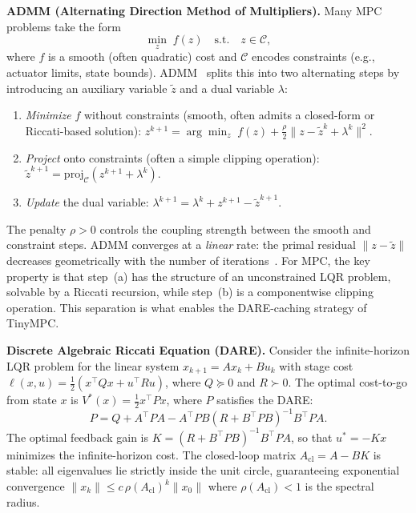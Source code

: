 \documentclass[letterpaper, 10pt, conference]{IEEEtran}
\begin{document}
\textbf{ADMM (Alternating Direction Method of Multipliers).}
Many MPC problems take the form
\begin{equation}\label{eq:admm_generic}
  \min_{z} \; f(z) \quad \text{s.t.} \quad z \in \mathcal{C},
\end{equation}
where $f$ is a smooth (often quadratic) cost and $\mathcal{C}$
encodes constraints (e.g., actuator limits, state bounds).
ADMM~\cite{boyd2011} splits this into two alternating steps
by introducing an auxiliary variable $\tilde{z}$ and a dual
variable $\lambda$:
\begin{enumerate}[label=(\alph*)]
  \item \emph{Minimize} $f$ without constraints (smooth, often
    admits a closed-form or Riccati-based solution):
    $z^{k+1} = \arg\min_z \; f(z) + \tfrac{\rho}{2}\|z - \tilde{z}^k + \lambda^k\|^2$.
  \item \emph{Project} onto constraints (often a simple clipping
    operation):
    $\tilde{z}^{k+1} = \mathrm{proj}_{\mathcal{C}}(z^{k+1} + \lambda^k)$.
  \item \emph{Update} the dual variable:
    $\lambda^{k+1} = \lambda^k + z^{k+1} - \tilde{z}^{k+1}$.
\end{enumerate}
The penalty $\rho > 0$ controls the coupling strength between
the smooth and constraint steps.
ADMM converges at a \emph{linear} rate: the primal residual
$\|z - \tilde{z}\|$ decreases geometrically with the number
of iterations~\cite{boyd2011}.
For MPC, the key property is that step~(a) has the structure
of an unconstrained LQR problem, solvable by a Riccati
recursion, while step~(b) is a componentwise clipping
operation.
This separation is what enables the DARE-caching strategy
of TinyMPC.

\textbf{Discrete Algebraic Riccati Equation (DARE).}
Consider the infinite-horizon LQR problem for the linear
system $x_{k+1} = A x_k + B u_k$ with stage cost
$\ell(x,u) = \frac{1}{2}(x^\top Q x + u^\top R u)$,
where $Q \succeq 0$ and $R \succ 0$.
The optimal cost-to-go from state $x$ is
$V^*(x) = \frac{1}{2} x^\top P x$,
where $P$ satisfies the DARE:
\begin{equation}\label{eq:dare_background}
  P = Q + A^\top P A
  - A^\top P B (R + B^\top P B)^{-1} B^\top P A.
\end{equation}
The optimal feedback gain is
$K = (R + B^\top P B)^{-1} B^\top P A$,
so that $u^* = -K x$ minimizes the infinite-horizon cost.
The closed-loop matrix $A_{\mathrm{cl}} = A - BK$ is stable:
all eigenvalues lie strictly inside the unit circle,
guaranteeing exponential convergence
$\|x_k\| \leq c \, \rho(A_{\mathrm{cl}})^k \|x_0\|$
where $\rho(A_{\mathrm{cl}}) < 1$ is the spectral radius.
\end{document}

